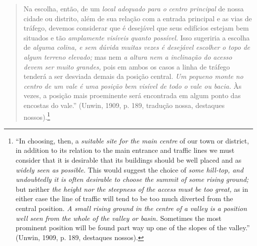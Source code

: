 \documentclass[12pt, a4paper]{book} %
\begin{document}
        \begin{quotation}
            Na escolha, então, de um \textit{local adequado para o centro principal} de nossa cidade ou distrito, além de sua relação com a entrada principal e as vias de tráfego, devemos considerar que é desejável que seus edifícios estejam bem situados e tão \textit{amplamente visíveis quanto possível.} Isso sugeriria a escolha de \textit{alguma colina, e sem dúvida muitas vezes é desejável escolher o topo de algum terreno elevado;} mas nem \textit{a altura nem a inclinação do acesso devem ser muito grandes,} pois em ambos os casos a linha de tráfego tenderá a ser desviada demais da posição central. \textit{Um pequeno monte no centro de um vale é uma posição bem visível de todo o vale ou bacia.} Às vezes, a posição mais proeminente será encontrada em algum ponto das encostas do vale.'' (Unwin, 1909, p. 189, tradução nossa, destaques nossos).\footnote[56]{``In choosing, then, a \textit{suitable site for the main centre} of our town or district, in addition to its relation to the main entrance and traffic lines we must consider that it is desirable that its buildings should be well placed and as \textit{widely seen as possible.} This would suggest the choice of \textit{some hill-top, and undoubtedly it is often desirable to choose the summit of some rising ground;} but neither \textit{the height nor the steepness of the access must be too great,} as in either case the line of traffic will tend to be too much diverted from the central position. \textit{A small rising ground in the centre of a valley is a position well seen from the whole of the valley or basin.} Sometimes the most prominent position will be found part way up one of the slopes of the valley.'' (Unwin, 1909, p. 189, destaques nossos).}
        \end{quotation}
\end{document}
